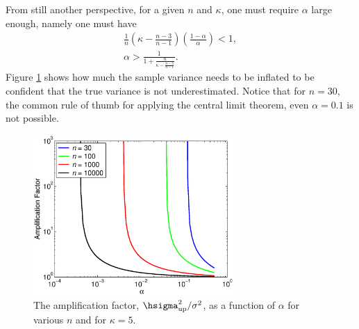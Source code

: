 \documentclass[12pt]{amsart}
\begin{document}
From still another perspective, for a given $n$ and $\kappa$, one must require $\alpha$ large enough, namely one must have
\begin{gather*}
\frac{1}{ n }\left(\kappa  - \frac{n-3}{n-1}\right)\left(\frac{1-\alpha}{\alpha}\right) < 1, \\
\alpha>\frac{1}{1+\frac{n}{\kappa  - \frac{n-3}{n-1}}}.
\end{gather*}
Figure  \ref{ampfacfig} shows how much the sample variance needs to be inflated to be confident that the true variance is not underestimated. Notice that for $n=30$, the common rule of thumb for applying the central limit theorem, even $\alpha=0.1$ is not possible.

\begin{figure}
\centering
\includegraphics[width=3in]{varianceampfac.eps}
\caption{The amplification factor, $\hsigma^2_{\text{up}}/\sigma^2$, as a function of $\alpha$ for various $n$ and for $\kappa=5$. \label{ampfacfig}}
\end{figure}
\end{document}
